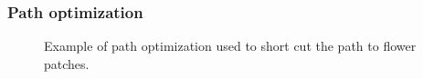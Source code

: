 	\subsubsection{Path optimization}
		\begin{figure}
			\centering
			\caption{Example of path optimization used to short cut the path to flower patches.}
		\end{figure}